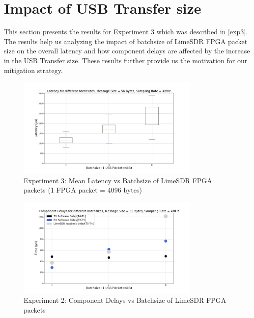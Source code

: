 \section{Impact of USB Transfer size} \label{ex3:results}
This section presents the results for Experiment 3 which was described in \ref{exp3}.
The results help us analyzing the impact of batchsize of LimeSDR FPGA packet size on the overall latency and how component delays are affected by the increase in the USB Transfer size.
These results further provide us the motivation for our mitigation strategy.\\

\begin{figure}[h!]
\centering
\includegraphics[width=0.8\textwidth]{Thesis/Figure/E3M2-1.png}
\caption{Experiment 3: Mean Latency vs Batchsize of LimeSDR FPGA packets (1 FPGA packet = 4096 bytes)}
\label{e3_1}
\end{figure}

\begin{figure}[h!]
\centering
\includegraphics[width=0.8\textwidth]{Thesis/Figure/E3M2-2.png}
\caption{Experiment 2: Component Delays vs Batchsize of LimeSDR FPGA packets}
\label{e3_2}
\end{figure}

